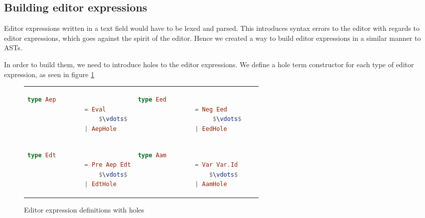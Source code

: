 \subsection{Building editor expressions}
Editor expressions written in a text field would have to be lexed and parsed.
This introduces syntax errors to the editor with regards to editor expressions,
which goes against the spirit of the editor. Hence we created a way to
build editor expressions in a similar manner to ASTs.

In order to build them, we need to introduce holes to the editor
expressions. We define a hole term constructor for each type of editor
expression, as seen in figure \ref{fig:editorexpressionswithholes}

\begin{figure}[H]
  \center
  \begin{tabular}{llll}

    \begin{lstlisting}[language=elm,%
                            gobble=8,%
                            mathescape,%
                            ]
             type Aep
                = Eval
                    $\vdots$
                | AepHole
        \end{lstlisting} &

    \begin{lstlisting}[language=elm,%
                            gobble=8,%
                            mathescape,%
                            ]
            type Eed
                = Neg Eed
                     $\vdots$
                | EedHole
        \end{lstlisting} \\

    \begin{lstlisting}[language=elm,%
                            gobble=8,%
                            mathescape,%
                            ]
            type Edt
                = Pre Aep Edt
                    $\vdots$
                | EdtHole
        \end{lstlisting} &

    \begin{lstlisting}[language=elm,%
                            gobble=8,%
                            mathescape,%
                            ]
            type Aam
                = Var Var.Id
                    $\vdots$
                | AamHole
        \end{lstlisting}
  \end{tabular}
  \caption{Editor expression definitions with holes}
  \label{fig:editorexpressionswithholes}
\end{figure}

